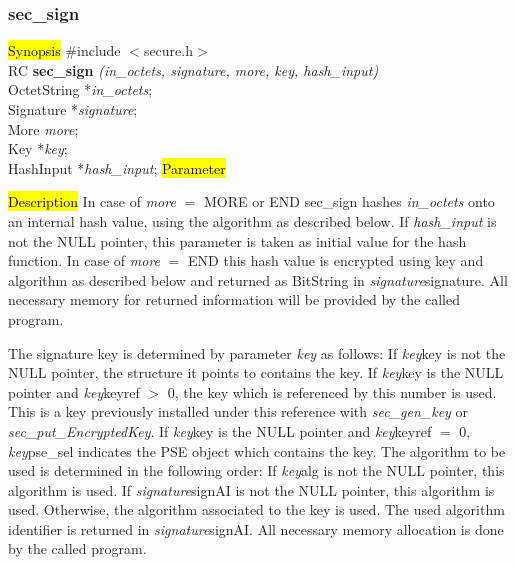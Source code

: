 \subsubsection{sec\_sign}
\label{sec_sign}
\hl{Synopsis}
\#include $<$secure.h$>$ \\ [0.5cm]
RC {\bf sec\_sign} {\em (in\_octets, signature, more, key, hash\_input)} \\
OctetString *{\em in\_octets}; \\
Signature *{\em signature}; \\
More {\em more}; \\
Key *{\em key}; \\
HashInput *{\em hash\_input};
\hl{Parameter}





\hl{Description}
In case of {\em more} $=$ MORE or END sec\_sign hashes {\em in\_octets} onto
an internal hash value, using the algorithm as described below.
If {\em hash\_input} is not the NULL pointer, this parameter is taken
as initial value for the hash function.
In case of {\em more} $=$ END this hash value is encrypted using key and
algorithm as described below and returned as BitString in {\em signature}\pf signature.
All necessary memory for returned information will be provided by the
called program. 

The signature key is determined by parameter {\em key} as follows:
\be
\m If {\em key}\pf key is not the NULL pointer, the structure it points to
   contains the key.
\m If {\em key}\pf key is the NULL pointer and {\em key}\pf keyref $>$ 0,
   the key which is referenced by this number is used. This is a key
   previously installed under this reference with {\em sec\_gen\_key} or 
   {\em sec\_put\_EncryptedKey}.
\m If {\em key}\pf key is the NULL pointer and {\em key}\pf keyref $=$ 0,
   {\em key}\pf pse\_sel indicates the PSE object which contains the key.
\ee
The algorithm to be used is determined in the following order:
\be
\m If {\em key}\pf alg is not the NULL pointer, this algorithm
   is used.
\m If {\em signature}\pf signAI is not the NULL pointer, this algorithm
   is used.
\m Otherwise, the algorithm associated to the key is used.
\ee
   The used algorithm identifier 
   is returned in {\em signature}\pf signAI.
   All necessary memory allocation is done by the called program.

